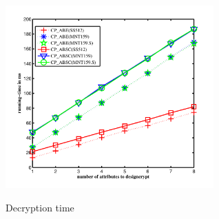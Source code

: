 \documentclass[letterpaper,12pt]{article}
\begin{document}
\begin{figure}[!htp]
\centering
 \includegraphics[width=8cm]{decryption}\\
 \centering \caption{Decryption time}\label{sec:Fig:Decryption time}
\end{figure}



\end{document}
